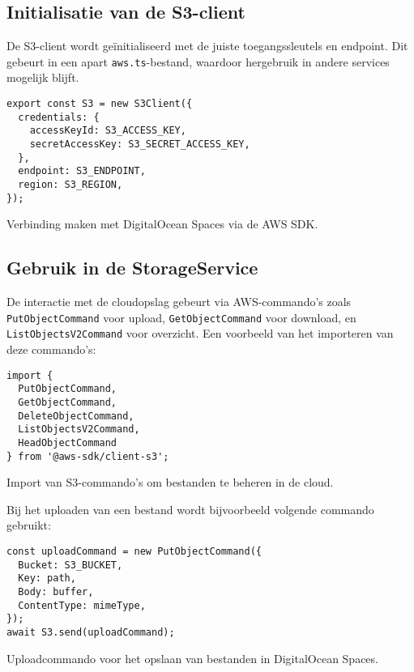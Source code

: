 \subsection{Initialisatie van de S3-client}

De S3-client wordt geïnitialiseerd met de juiste toegangssleutels en endpoint. Dit gebeurt in een apart \texttt{aws.ts}-bestand, waardoor hergebruik in andere services mogelijk blijft.

\begin{listing}[H]
\begin{verbatim}
export const S3 = new S3Client({
  credentials: {
    accessKeyId: S3_ACCESS_KEY,
    secretAccessKey: S3_SECRET_ACCESS_KEY,
  },
  endpoint: S3_ENDPOINT,
  region: S3_REGION,
});
\end{verbatim}
\caption[Initialisatie van de S3-client]{Verbinding maken met DigitalOcean Spaces via de AWS SDK.}
\end{listing}

\subsection{Gebruik in de StorageService}

De interactie met de cloudopslag gebeurt via AWS-commando’s zoals \texttt{PutObjectCommand} voor upload, \texttt{GetObjectCommand} voor download, en \texttt{ListObjectsV2Command} voor overzicht. Een voorbeeld van het importeren van deze commando’s:

\begin{listing}[H]
\begin{verbatim}
import {
  PutObjectCommand,
  GetObjectCommand,
  DeleteObjectCommand,
  ListObjectsV2Command,
  HeadObjectCommand
} from '@aws-sdk/client-s3';
\end{verbatim}
\caption[Import van S3-commando's]{Import van S3-commando's om bestanden te beheren in de cloud.}
\end{listing}

Bij het uploaden van een bestand wordt bijvoorbeeld volgende commando gebruikt:

\begin{listing}[H]
\begin{verbatim}
const uploadCommand = new PutObjectCommand({
  Bucket: S3_BUCKET,
  Key: path,
  Body: buffer,
  ContentType: mimeType,
});
await S3.send(uploadCommand);
\end{verbatim}
\caption[Uploaden van bestanden naar S3]{Uploadcommando voor het opslaan van bestanden in DigitalOcean Spaces.}
\end{listing}

